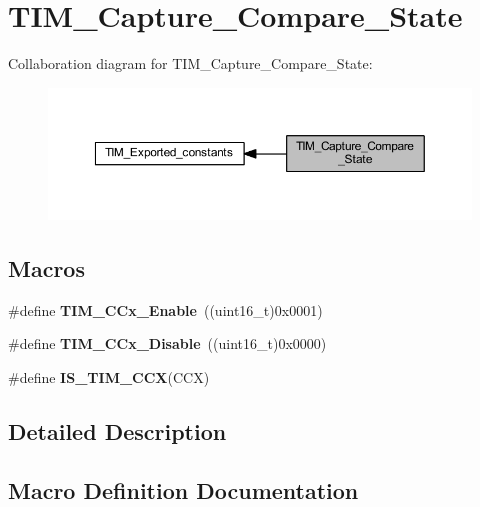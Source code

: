\hypertarget{group___t_i_m___capture___compare___state}{}\section{T\+I\+M\+\_\+\+Capture\+\_\+\+Compare\+\_\+\+State}
\label{group___t_i_m___capture___compare___state}
Collaboration diagram for T\+I\+M\+\_\+\+Capture\+\_\+\+Compare\+\_\+\+State\+:
\nopagebreak
\begin{figure}[H]
\begin{center}
\leavevmode
\includegraphics[width=350pt]{group___t_i_m___capture___compare___state}
\end{center}
\end{figure}
\subsection*{Macros}
\begin{DoxyCompactItemize}
\item 
\mbox{\label{group___t_i_m___capture___compare___state_ga6acaeb60dad50ce9799ae9f62ed7719a}} 
\#define {\bfseries T\+I\+M\+\_\+\+C\+Cx\+\_\+\+Enable}~((uint16\+\_\+t)0x0001)
\item 
\mbox{\label{group___t_i_m___capture___compare___state_gaa1441f66393b9daa9f97efb29b364cd3}} 
\#define {\bfseries T\+I\+M\+\_\+\+C\+Cx\+\_\+\+Disable}~((uint16\+\_\+t)0x0000)
\item 
\#define {\bfseries I\+S\+\_\+\+T\+I\+M\+\_\+\+C\+CX}(C\+CX)
\end{DoxyCompactItemize}


\subsection{Detailed Description}


\subsection{Macro Definition Documentation}
\mbox{\label{group___t_i_m___capture___compare___state_ga5b7461e8c9c25f6fa082118c95b02ba1}} 
